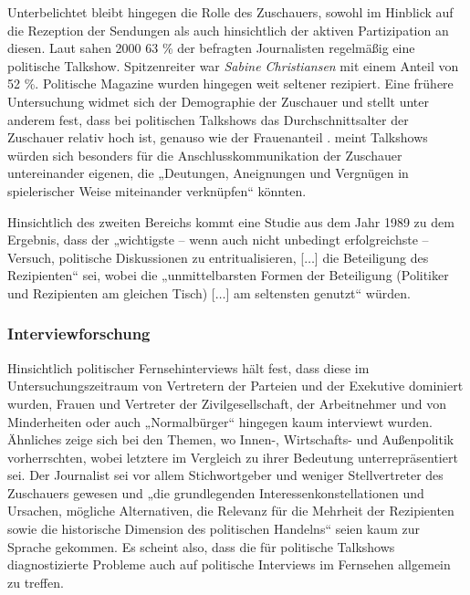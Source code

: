 Unterbelichtet bleibt hingegen die Rolle des Zuschauers, sowohl im Hinblick auf die Rezeption der Sendungen als auch hinsichtlich der aktiven Partizipation an diesen. Laut \textcite[174\psqq]{reinemannMedienmacherAlsMediennutzer2003} sahen 2000 63 \% der befragten Journalisten regelmäßig eine politische Talkshow. Spitzenreiter war \textit{Sabine Christiansen} mit einem Anteil von 52 \%. Politische Magazine wurden hingegen weit seltener rezipiert. Eine frühere Untersuchung widmet sich der Demographie der Zuschauer und stellt unter anderem fest, dass bei politischen Talkshows das Durchschnittsalter der Zuschauer relativ hoch ist, genauso wie der Frauenanteil \parencite{gerhardsTalkshownutzungUndTalkshownutzer2002}. \textcite{hollyFernsehkommunikationUndAnschlusskommunikation2002} meint Talkshows würden sich besonders für die Anschlusskommunikation der Zuschauer untereinander eigenen, die „Deutungen, Aneignungen und Vergnügen in spielerischer Weise miteinander verknüpfen“ \textcite[366]{hollyFernsehkommunikationUndAnschlusskommunikation2002} könnten.

Hinsichtlich des zweiten Bereichs kommt eine Studie aus dem Jahr 1989 zu dem Ergebnis, dass der „wichtigste – wenn auch nicht unbedingt erfolgreichste – Versuch, politische Diskussionen zu entritualisieren, [$\ldots$] die Beteiligung des Rezipienten“ \parencite[140]{burgerDiskussionOhnRitual1989} sei, wobei die „unmittelbarsten Formen der Beteiligung (Politiker und Rezipienten am gleichen Tisch) [$\ldots$] am seltensten genutzt“ \parencite[140]{burgerDiskussionOhnRitual1989} würden.

\subsubsection{Interviewforschung}

Hinsichtlich politischer Fernsehinterviews hält \textcite[143–152]{hoffmannPolitischeFernsehinterviewsEmpirische1982} fest, dass diese im Untersuchungszeitraum von Vertretern der Parteien und der Exekutive dominiert wurden, Frauen und Vertreter der Zivilgesellschaft, der Arbeitnehmer und von Minderheiten oder auch „Normalbürger“ hingegen kaum interviewt wurden. Ähnliches zeige sich bei den Themen, wo Innen-, Wirtschafts- und Außenpolitik vorherrschten, wobei letztere im Vergleich zu ihrer Bedeutung unterrepräsentiert sei. Der Journalist sei vor allem Stichwortgeber und weniger Stellvertreter des Zuschauers gewesen und „die grundlegenden Interessenkonstellationen und Ursachen, mögliche Alternativen, die Relevanz für die Mehrheit der Rezipienten sowie die historische Dimension des politischen Handelns“ \textcite[148]{hoffmannPolitischeFernsehinterviewsEmpirische1982} seien kaum zur Sprache gekommen. Es scheint also, dass die für politische Talkshows diagnostizierte Probleme auch auf politische Interviews im Fernsehen allgemein zu treffen.

